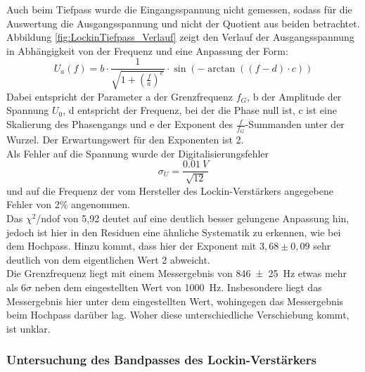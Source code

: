 \documentclass[12pt,a4paper]{article}
\begin{document}
Auch beim Tiefpass wurde die Eingangsspannung nicht gemessen, sodass für die Auswertung die Ausgangsspannung und nicht der Quotient aus beiden betrachtet. \\
Abbildung \ref{fig:LockinTiefpass_Verlauf} zeigt den Verlauf der Ausgangsspannung in Abhängigkeit von der Frequenz und eine Anpassung der Form:
\begin{equation*}
U_a (f) = b \cdot \dfrac{1}{\sqrt{1 + \left( \frac{f}{a} \right)^e}} \cdot \sin \left( - \arctan \left( \left( f-d \right) \cdot c \right) \right)
\end{equation*}
Dabei entspricht der Parameter a der Grenzfrequenz $f_G$, b der Amplitude der Spannung $U_0$, d entspricht der Frequenz, bei der die Phase null ist, c ist eine Skalierung des Phasengangs und e der Exponent des $\frac{f}{f_G}$-Summanden unter der Wurzel. Der Erwartungswert für den Exponenten ist 2. \\
Als Fehler auf die Spannung wurde der Digitalisierungsfehler 
\begin{equation*}
\sigma _U = \dfrac{\SI{0.01}{V}}{\sqrt{12}}
\end{equation*}
und auf die Frequenz der vom Hersteller des Lockin-Verstärkers angegebene Fehler von 2\% angenommen. \\
Das $\chi ^2$/ndof von 5,92 deutet auf eine deutlich besser gelungene Anpassung hin, jedoch ist hier in den Residuen eine ähnliche Systematik zu erkennen, wie bei dem Hochpass. Hinzu kommt, dass hier der Exponent mit $3,68 \pm 0,09$ sehr deutlich von dem eigentlichen Wert 2 abweicht. \\
Die Grenzfrequenz liegt mit einem Messergebnis von \SI{846 \pm 25}{Hz} etwas mehr als 6$\sigma$ neben dem eingestellten Wert von \SI{1000}{Hz}. Insbesondere liegt das Messergebnis hier unter dem eingestellten Wert, wohingegen das Messergebnis beim Hochpass darüber lag. Woher diese unterschiedliche Verschiebung kommt, ist unklar.

\subsubsection{Untersuchung des Bandpasses des Lockin-Verstärkers}
\end{document}
